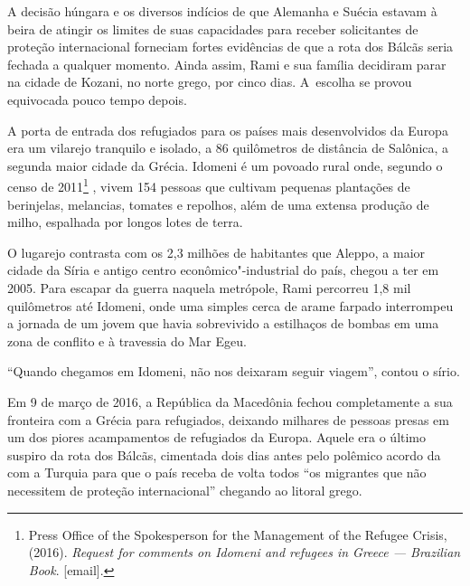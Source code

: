 A decisão húngara e os diversos indícios de que Alemanha e Suécia
estavam à beira de atingir os limites de suas capacidades para receber
solicitantes de proteção internacional forneciam fortes 
evidências de que a rota dos Bálcãs seria fechada a qualquer momento.
Ainda assim, Rami e sua família decidiram parar na cidade de Kozani, no
norte grego, por cinco dias. A~escolha se provou equivocada pouco
tempo depois.

A porta de entrada dos refugiados para os países mais desenvolvidos da Europa era um
vilarejo tranquilo e isolado, a 86 quilômetros de distância de Salônica,
a segunda maior cidade da Grécia. Idomeni é um povoado rural onde,
segundo o censo de 2011\footnote{ Press Office of the Spokesperson for the Management
of the Refugee Crisis, (2016). \emph{Request for comments on Idomeni and
refugees in Greece --- Brazilian Book}. {[}email{]}.} , vivem 154 pessoas que
cultivam pequenas plantações de berinjelas, melancias, tomates e
repolhos, além de uma extensa produção de milho, espalhada por longos
lotes de terra.

O lugarejo contrasta com os 2,3 milhões de habitantes que Aleppo, a
maior cidade da Síria e antigo centro econômico"-industrial do país,
chegou a ter em 2005. Para escapar da guerra naquela metrópole, Rami
percorreu 1,8 mil quilômetros até Idomeni, onde uma simples cerca de
arame farpado interrompeu a jornada de um jovem que havia sobrevivido a
estilhaços de bombas em uma zona de conflito e à travessia do Mar Egeu.

``Quando chegamos em Idomeni, não nos deixaram seguir viagem'', contou
o sírio.

Em 9 de março de 2016, a República da Macedônia fechou completamente a sua
fronteira com a Grécia para refugiados, deixando milhares de
pessoas presas em um dos piores acampamentos de refugiados da Europa.
Aquele era o último suspiro da rota dos Bálcãs, cimentada dois dias
antes pelo polêmico acordo da  com a Turquia para que o país receba de volta todos ``os migrantes que não necessitem de proteção
internacional'' chegando ao litoral grego.
% 
% 
% 
%
%

